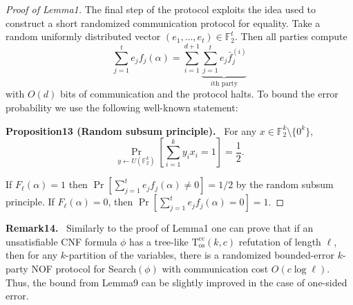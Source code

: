\documentclass[10pt,a4paper]{article}
\newenvironment{authorclaim}[1]{\par\medskip\noindent\textbf{#1.}\ \ignorespaces}{\par\medskip}
\begin{document}
\begin{proof}[Proof of Lemma1]
The final step of the protocol exploits the idea used to construct a short randomized communication protocol for equality. Take a random uniformly distributed vector $(e_1,\ldots,e_t)\in\mathbb F_2^t$. Then all parties compute
\[\sum_{j=1}^te_jf_j(\alpha)=\sum_{i=1}^{d+1}\underbrace{\sum_{j=1}^te_j\bar f_j^{(i)}}_{i\text{th party}}\]
with $O(d)$ bits of communication and the protocol halts. To bound the error probability we use the following well-known statement:
\begin{authorclaim}{Proposition13 (Random subsum principle)}
For any $x\in\mathbb F_2^k\setminus\{0^k\}$,
\[\Pr_{y\leftarrow U(\mathbb F_2^k)}\left[\sum_{i=1}^ky_ix_i=1\right]=\frac12.\]
\end{authorclaim}
If $F_\ell(\alpha)=1$ then $\Pr[\sum_{j=1}^te_jf_j(\alpha)\ne0]=1/2$ by the random subsum principle. If $F_\ell(\alpha)=0$, then $\Pr[\sum_{j=1}^te_jf_j(\alpha)=0]=1$.
\end{proof}
\begin{authorclaim}{Remark14}
Similarly to the proof of Lemma1 one can prove that if an unsatisfiable CNF formula $\phi$ has a tree-like $\mathrm T^{\mathrm{cc}}_{\mathrm{os}}(k,c)$ refutation of length $\ell$, then for any $k$-partition of the variables, there is a randomized bounded-error $k$-party NOF protocol for Search$(\phi)$ with communication cost $O(c\log\ell)$. Thus, the bound from Lemma9 can be slightly improved in the case of one-sided error.
\end{authorclaim}
\end{document}
